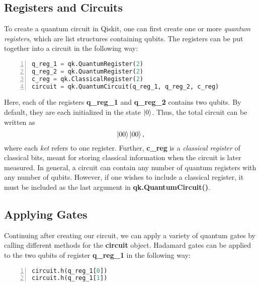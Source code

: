 \subsection{Registers and Circuits}\label{sec:QMLE}

To create a quantum circuit in Qiskit, one can first create one or more \emph{quantum registers}, which are list structures containing qubits. The registers can be put together into a circuit in the following way:

\begin{lstlisting}[language=python, numbers=left]
q_reg_1 = qk.QuantumRegister(2)
q_reg_2 = qk.QuantumRegister(2)
c_reg = qk.ClassicalRegister(2)
circuit = qk.QuantumCircuit(q_reg_1, q_reg_2, c_reg)
\end{lstlisting}
Here, each of the registers \textbf{q\_reg\_1} and \textbf{q\_reg\_2} contains two qubits. By default, they are each initialized in the state $\ket{0}$. Thus, the total circuit can be written as
\begin{equation}
    \ket{00}\ket{00},
\end{equation}
where each \emph{ket} refers to one register. Further, \textbf{c\_reg} is a \emph{classical register} of classical bits, meant for storing classical information when the circuit is later measured. In general, a circuit can contain any number of quantum registers with any number of qubits. However, if one wishes to include a classical register, it must be included as the last argument in \textbf{qk.QuantumCircuit()}.

\subsection{Applying Gates}\label{sec:operationsOnQubits}

Continuing after creating our circuit, we can apply a variety of quantum gates by calling different methods for the \textbf{circuit} object. Hadamard gates can be applied to the two qubits of register \textbf{q\_reg\_1} in the following way:

\begin{lstlisting}[language=python, numbers=left]
circuit.h(q_reg_1[0])
circuit.h(q_reg_1[1])
\end{lstlisting}

